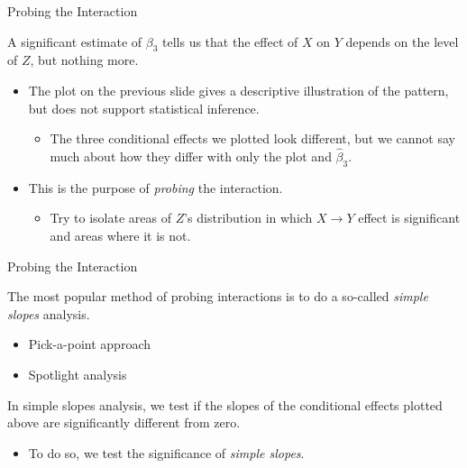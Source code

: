 \documentclass{beamer}\usepackage[]{graphicx}\usepackage[]{color}
\begin{document}
\begin{frame}{Probing the Interaction}

  A significant estimate of $\beta_3$ tells us that the effect of $X$ on $Y$ 
  depends on the level of $Z$, but nothing more.
  \vb
  \begin{itemize}
  \item The plot on the previous slide gives a descriptive illustration of the 
    pattern, but does not support statistical inference.
    \vc
    \begin{itemize}
    \item The three conditional effects we plotted look different, but we cannot 
      say much about how they differ with only the plot and $\hat{\beta}_3$.
    \end{itemize}
    \vb
  \item This is the purpose of \emph{probing} the interaction.
    \vc
    \begin{itemize}
    \item Try to isolate areas of $Z$'s distribution in which $X \rightarrow Y$
      effect is significant and areas where it is not.
    \end{itemize}
  \end{itemize}
  
\end{frame}


\begin{frame}{Probing the Interaction}

  The most popular method of probing interactions is to do a so-called 
  \emph{simple slopes} analysis.
  \vc
  \begin{itemize}
  \item Pick-a-point approach
    \vc
  \item Spotlight analysis
  \end{itemize}
  \vb
  In simple slopes analysis, we test if the slopes of the conditional effects 
  plotted above are significantly different from zero.
  \vc
  \begin{itemize}
  \item To do so, we test the significance of \emph{simple slopes}.
  \end{itemize}
  
\end{frame}

\end{document}
